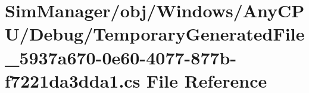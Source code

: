 \hypertarget{_sim_manager_2obj_2_windows_2_any_c_p_u_2_debug_2_temporary_generated_file__5937a670-0e60-4077-877b-f7221da3dda1_8cs}{}\section{Sim\+Manager/obj/\+Windows/\+Any\+C\+P\+U/\+Debug/\+Temporary\+Generated\+File\+\_\+5937a670-\/0e60-\/4077-\/877b-\/f7221da3dda1.cs File Reference}
\label{_sim_manager_2obj_2_windows_2_any_c_p_u_2_debug_2_temporary_generated_file__5937a670-0e60-4077-877b-f7221da3dda1_8cs}
